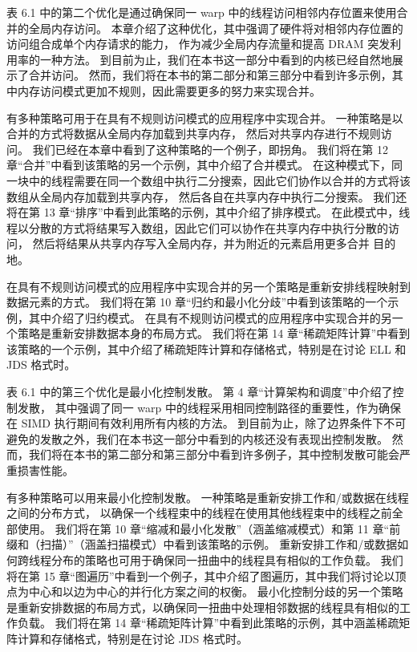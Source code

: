 表 6.1 中的第二个优化是通过确保同一 warp 中的线程访问相邻内存位置来使用合并的全局内存访问。 
本章介绍了这种优化，其中强调了硬件将对相邻内存位置的访问组合成单个内存请求的能力，
作为减少全局内存流量和提高 DRAM 突发利用率的一种方法。 
到目前为止，我们在本书这一部分中看到的内核已经自然地展示了合并访问。 
然而，我们将在本书的第二部分和第三部分中看到许多示例，其中内存访问模式更加不规则，因此需要更多的努力来实现合并。

有多种策略可用于在具有不规则访问模式的应用程序中实现合并。 一种策略是以合并的方式将数据从全局内存加载到共享内存，
然后对共享内存进行不规则访问。 我们已经在本章中看到了这种策略的一个例子，即拐角。 
我们将在第 12 章“合并”中看到该策略的另一个示例，其中介绍了合并模式。 
在这种模式下，同一块中的线程需要在同一个数组中执行二分搜索，因此它们协作以合并的方式将该数组从全局内存加载到共享内存，
然后各自在共享内存中执行二分搜索。 我们还将在第 13 章“排序”中看到此策略的示例，其中介绍了排序模式。 
在此模式中，线程以分散的方式将结果写入数组，因此它们可以协作在共享内存中执行分散的访问，
然后将结果从共享内存写入全局内存，并为附近的元素启用更多合并 目的地。

在具有不规则访问模式的应用程序中实现合并的另一个策略是重新安排线程映射到数据元素的方式。 
我们将在第 10 章“归约和最小化分歧”中看到该策略的一个示例，其中介绍了归约模式。 
在具有不规则访问模式的应用程序中实现合并的另一个策略是重新安排数据本身的布局方式。 
我们将在第 14 章“稀疏矩阵计算”中看到该策略的一个示例，其中介绍了稀疏矩阵计算和存储格式，特别是在讨论 ELL 和 JDS 格式时。

表 6.1 中的第三个优化是最小化控制发散。 第 4 章“计算架构和调度”中介绍了控制发散，
其中强调了同一 warp 中的线程采用相同控制路径的重要性，作为确保在 SIMD 执行期间有效利用所有内核的方法。 
到目前为止，除了边界条件下不可避免的发散之外，我们在本书这一部分中看到的内核还没有表现出控制发散。 
然而，我们将在本书的第二部分和第三部分中看到许多例子，其中控制发散可能会严重损害性能。

有多种策略可以用来最小化控制发散。 一种策略是重新安排工作和/或数据在线程之间的分布方式，
以确保一个线程束中的线程在使用其他线程束中的线程之前全部使用。 
我们将在第 10 章“缩减和最小化发散”（涵盖缩减模式）和第 11 章“前缀和（扫描）”（涵盖扫描模式）中看到该策略的示例。 
重新安排工作和/或数据如何跨线程分布的策略也可用于确保同一扭曲中的线程具有相似的工作负载。 
我们将在第 15 章“图遍历”中看到一个例子，其中介绍了图遍历，其中我们将讨论以顶点为中心和以边为中心的并行化方案之间的权衡。 
最小化控制分歧的另一个策略是重新安排数据的布局方式，以确保同一扭曲中处理相邻数据的线程具有相似的工作负载。 
我们将在第 14 章“稀疏矩阵计算”中看到此策略的示例，其中涵盖稀疏矩阵计算和存储格式，特别是在讨论 JDS 格式时。

